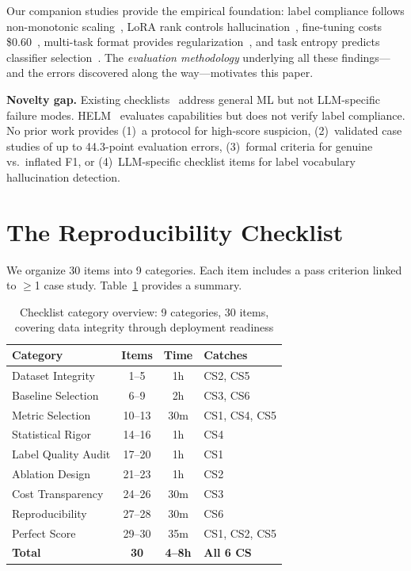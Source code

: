 \documentclass[review,3p]{elsarticle}
\begin{document}
Our companion studies provide the empirical foundation: label compliance follows non-monotonic scaling~\cite{p6}, LoRA rank controls hallucination~\cite{p22}, fine-tuning costs \$0.60~\cite{p7}, multi-task format provides regularization~\cite{p15}, and task entropy predicts classifier selection~\cite{p8}. The \emph{evaluation methodology} underlying all these findings---and the errors discovered along the way---motivates this paper.

\textbf{Novelty gap.} Existing checklists~\cite{pineau2021,dodge2019} address general ML but not LLM-specific failure modes. HELM~\cite{liang2022} evaluates capabilities but does not verify label compliance. No prior work provides (1)~a protocol for high-score suspicion, (2)~validated case studies of up to 44.3-point evaluation errors, (3)~formal criteria for genuine vs.\ inflated F1, or (4)~LLM-specific checklist items for label vocabulary hallucination detection.

\section{The Reproducibility Checklist}

We organize 30 items into 9 categories. Each item includes a pass criterion linked to $\geq$1 case study. Table~\ref{tab:overview} provides a summary.

\begin{table}[!ht]
\centering
\caption{Checklist category overview: 9 categories, 30 items, covering data integrity through deployment readiness}
\label{tab:overview}
\begin{tabular}{lccl}
\toprule
\textbf{Category} & \textbf{Items} & \textbf{Time} & \textbf{Catches} \\
\midrule
Dataset Integrity & 1--5 & 1h & CS2, CS5 \\
Baseline Selection & 6--9 & 2h & CS3, CS6 \\
Metric Selection & 10--13 & 30m & CS1, CS4, CS5 \\
Statistical Rigor & 14--16 & 1h & CS4 \\
Label Quality Audit & 17--20 & 1h & CS1 \\
Ablation Design & 21--23 & 1h & CS2 \\
Cost Transparency & 24--26 & 30m & CS3 \\
Reproducibility & 27--28 & 30m & CS6 \\
Perfect Score & 29--30 & 35m & CS1, CS2, CS5 \\
\midrule
\textbf{Total} & \textbf{30} & \textbf{4--8h} & \textbf{All 6 CS} \\
\bottomrule
\end{tabular}
\end{table}
\end{document}
